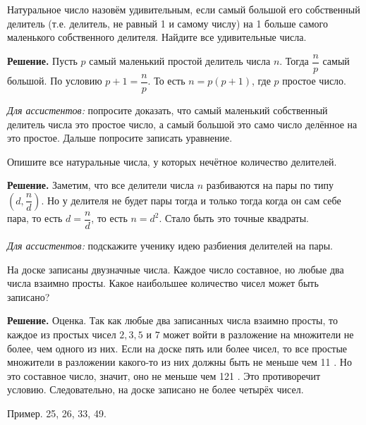 Натуральное число назовём удивительным, если самый большой его собственный делитель (т.е. делитель, не равный 1 и самому числу) на 1 больше самого маленького собственного делителя. Найдите все удивительные числа.

\textbf{Решение.} Пусть $p$ самый маленький простой делитель числа $n$. Тогда $\dfrac{n}{p}$ самый большой. По условию $p+1 = \dfrac{n}{p}$. То есть $n = p(p+1)$, где $p$ простое число. 

\textit{Для ассистентов:} попросите доказать, что самый маленький собственный делитель числа это простое число, а самый большой это само число делённое на это простое. Дальше попросите записать уравнение.

Опишите все натуральные числа, у которых нечётное количество делителей.

\textbf{Решение.} Заметим, что все делители числа $n$ разбиваются на пары по типу $(d, \dfrac{n}{d})$. Но у делителя не будет пары тогда и только тогда когда он сам себе пара, то есть $d = \dfrac{n}{d}$, то есть $n = d^2$. Стало быть это точные квадраты.

\textit{Для ассистентов:} подскажите ученику идею разбиения делителей на пары.

На доске записаны двузначные числа. Каждое число составное, но любые два числа взаимно просты. Какое наибольшее количество чисел может быть записано?

\textbf{Решение.}
Оценка. Так как любые два записанных числа взаимно просты, то каждое из простых чисел $2,3,5$ и $7$ может войти в разложение на множители не более, чем одного из них. Если на доске пять или более чисел, то все простые множители в разложении какого-то из них должны быть не меньше чем 11 . Но это составное число, значит, оно не меньше чем 121 . Это противоречит условию. Следовательно, на доске записано не более четырёх чисел.

Пример. 25, 26, 33, 49.